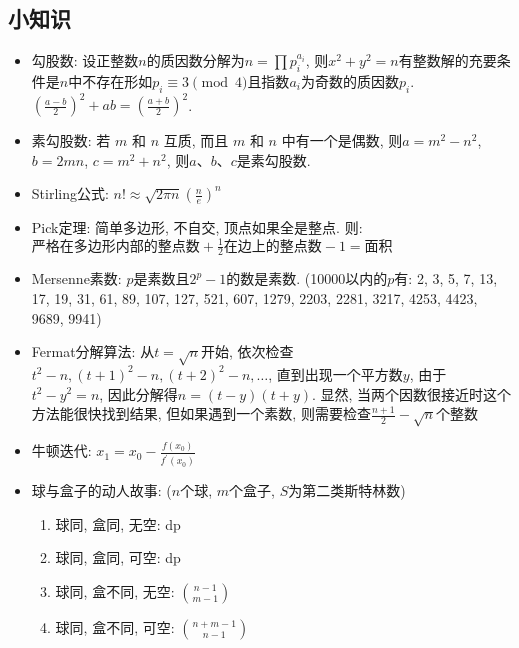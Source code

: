 \documentclass[landscape, twocolumn, 8pt, a4paper, twoside]{extarticle}
\begin{document}
  \subsection{小知识}
  \begin{itemize}
  \item 勾股数: 设正整数$n$的质因数分解为$n = \prod p_i ^ {a_i}$, 
    则$x^2+y^2=n$有整数解的充要条件是$n$中不存在形如$p_i \equiv 3\pmod{4}$且指数$a_i$为奇数的质因数$p_i$.
    $(\frac{a - b}{2})^2 + ab = (\frac{a + b}{2})^2$.
  \item 素勾股数: 若 $m$ 和 $n$ 互质, 而且 $m$ 和 $n$ 中有一个是偶数, 则$a = m^2 - n^2$, $b = 2mn$, $c = m^2 + n^2$, 则$a$、$b$、$c$是素勾股数. 
  \item Stirling公式: $n! \approx \sqrt{2 \pi n} (\frac{n}{e})^n$
  \item Pick定理: 简单多边形, 不自交, 顶点如果全是整点. 则: 
        $ \textrm{严格在多边形内部的整点数} + \frac{1}{2} \textrm{在边上的整点数} - 1 = \textrm{面积}$
  \item Mersenne素数: $p$是素数且$2^p-1$的数是素数. (10000以内的$p$有: 2, 3, 5, 7, 13, 17, 19, 31, 61, 89, 107, 127, 521, 607, 1279, 2203, 2281, 3217, 4253, 4423, 9689, 9941)
  \item Fermat分解算法: 
    从$t=\sqrt{n}$开始, 
    依次检查$t^2-n,(t+1)^2-n,(t+2)^2-n,\ldots$, 
    直到出现一个平方数$y$, 
    由于$t ^ 2 - y ^ 2 = n$, 
    因此分解得$n = (t -y)(t + y)$. 
    显然, 当两个因数很接近时这个方法能很快找到结果, 
    但如果遇到一个素数, 则需要检查$\frac{n + 1}{2} - \sqrt{n}$个整数
  \item 牛顿迭代:
    $x_1 = x_0 - \frac{f(x_0)}{f^\prime(x_0)}$
  \item 球与盒子的动人故事: ($n$个球, $m$个盒子, $S$为第二类斯特林数)
    \begin{enumerate}
    \item 球同, 盒同, 无空: dp
    \item 球同, 盒同, 可空: dp
    \item 球同, 盒不同, 无空: $\binom{n - 1}{m - 1}$
    \item 球同, 盒不同, 可空: $\binom{n + m - 1}{n - 1}$

\end{enumerate}
\end{itemize}
\end{document}
